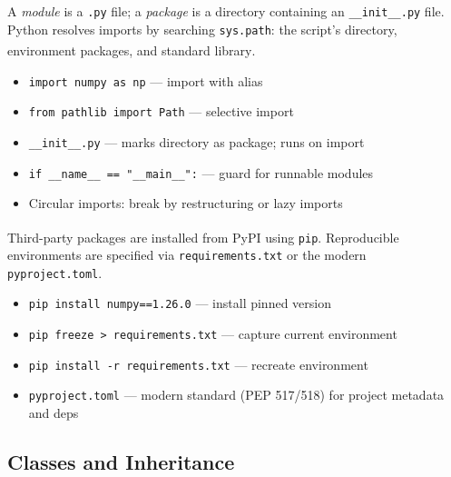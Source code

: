 \begin{tcbitemize}[ skin=sectionraster ]
    \tcbitem[title={Modules and the Import System}, raster multicolumn=3]
    A \emph{module} is a \texttt{.py} file; a \emph{package} is a directory containing an \texttt{\_\_init\_\_.py} file.
    Python resolves imports by searching \texttt{sys.path}: the script's directory, environment packages, and standard library\textsuperscript{\cite{romanoLearnPythonProgramming2021}}.
    \tcblower
    \begin{itemize}
        \item \texttt{import numpy as np} --- import with alias
        \item \texttt{from pathlib import Path} --- selective import
        \item \texttt{\_\_init\_\_.py} --- marks directory as package; runs on import
        \item \texttt{if \_\_name\_\_ == "\_\_main\_\_":} --- guard for runnable modules
        \item Circular imports: break by restructuring or lazy imports
    \end{itemize}

    \tcbitem[title={Package Management with pip}, raster multicolumn=3]
    Third-party packages are installed from PyPI using \texttt{pip}\textsuperscript{\cite{romanoLearnPythonProgramming2021}}.
    Reproducible environments are specified via \texttt{requirements.txt} or the modern \texttt{pyproject.toml}.
    \tcblower
    \begin{itemize}
        \item \texttt{pip install numpy==1.26.0} --- install pinned version
        \item \texttt{pip freeze > requirements.txt} --- capture current environment
        \item \texttt{pip install -r requirements.txt} --- recreate environment
        \item \texttt{pyproject.toml} --- modern standard (PEP 517/518) for project metadata and deps
    \end{itemize}
\end{tcbitemize}

\subsection{Classes and Inheritance}

